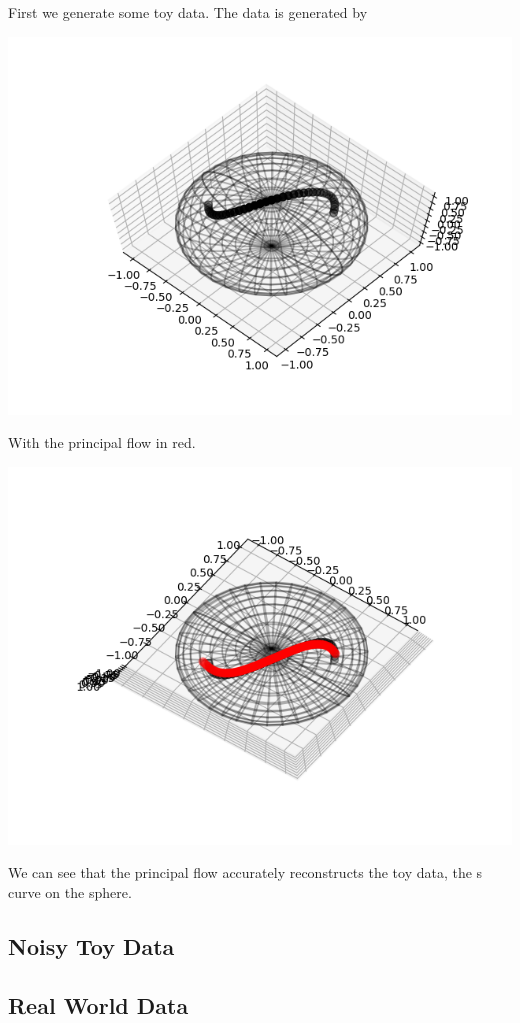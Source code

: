 \documentclass[12pt]{report}
\begin{document}
First we generate some toy data. The data is generated by 

\includegraphics[]{Data_13.png}

With the principal flow in red.

\includegraphics[]{single_flow_13.png}

We can see that the principal flow accurately reconstructs the toy data, 
the s curve on the sphere.

\subsection{Noisy Toy Data}

\subsection{Real World Data}
\end{document}
